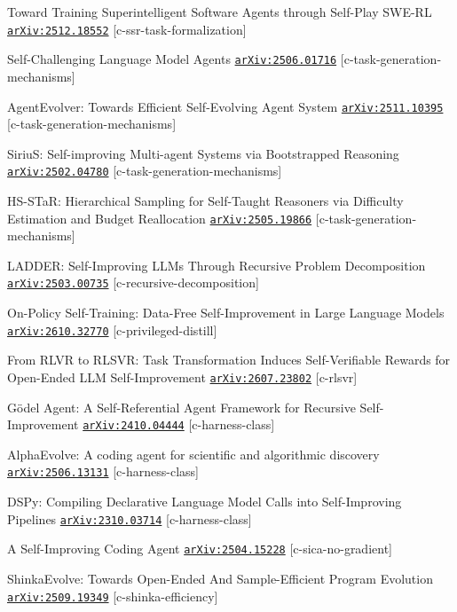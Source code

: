 \begin{refs}
[23] Toward Training Superintelligent Software Agents through Self-Play SWE-RL \href{https://arxiv.org/abs/2512.18552}{\texttt{arXiv:2512.18552}} [c-ssr-task-formalization]\par
[24] Self-Challenging Language Model Agents \href{https://arxiv.org/abs/2506.01716}{\texttt{arXiv:2506.01716}} [c-task-generation-mechanisms]\par
[25] AgentEvolver: Towards Efficient Self-Evolving Agent System \href{https://arxiv.org/abs/2511.10395}{\texttt{arXiv:2511.10395}} [c-task-generation-mechanisms]\par
[26] SiriuS: Self-improving Multi-agent Systems via Bootstrapped Reasoning \href{https://arxiv.org/abs/2502.04780}{\texttt{arXiv:2502.04780}} [c-task-generation-mechanisms]\par
[27] HS-STaR: Hierarchical Sampling for Self-Taught Reasoners via Difficulty Estimation and Budget Reallocation \href{https://arxiv.org/abs/2505.19866}{\texttt{arXiv:2505.19866}} [c-task-generation-mechanisms]\par
[28] LADDER: Self-Improving LLMs Through Recursive Problem Decomposition \href{https://arxiv.org/abs/2503.00735}{\texttt{arXiv:2503.00735}} [c-recursive-decomposition]\par
[29] On-Policy Self-Training: Data-Free Self-Improvement in Large Language Models \href{https://arxiv.org/abs/2610.32770}{\texttt{arXiv:2610.32770}} [c-privileged-distill]\par
[30] From RLVR to RLSVR: Task Transformation Induces Self-Verifiable Rewards for Open-Ended LLM Self-Improvement \href{https://arxiv.org/abs/2607.23802}{\texttt{arXiv:2607.23802}} [c-rlsvr]\par
[31] Gödel Agent: A Self-Referential Agent Framework for Recursive Self-Improvement \href{https://arxiv.org/abs/2410.04444}{\texttt{arXiv:2410.04444}} [c-harness-class]\par
[32] AlphaEvolve: A coding agent for scientific and algorithmic discovery \href{https://arxiv.org/abs/2506.13131}{\texttt{arXiv:2506.13131}} [c-harness-class]\par
[33] DSPy: Compiling Declarative Language Model Calls into Self-Improving Pipelines \href{https://arxiv.org/abs/2310.03714}{\texttt{arXiv:2310.03714}} [c-harness-class]\par
[34] A Self-Improving Coding Agent \href{https://arxiv.org/abs/2504.15228}{\texttt{arXiv:2504.15228}} [c-sica-no-gradient]\par
[35] ShinkaEvolve: Towards Open-Ended And Sample-Efficient Program Evolution \href{https://arxiv.org/abs/2509.19349}{\texttt{arXiv:2509.19349}} [c-shinka-efficiency]\par

\end{refs}
